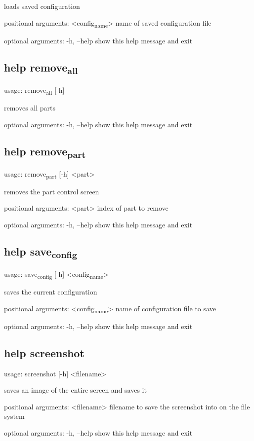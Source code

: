 \documentclass[11pt]{article}
\begin{document}
loads saved configuration

positional arguments:
  <config\textsubscript{name}>  name of saved configuration file

optional arguments:
  -h, --help     show this help message and exit

\subsection{help remove\textsubscript{all}}
\label{sec:orgad7ff3c}
usage: remove\textsubscript{all} [-h]

removes all parts

optional arguments:
  -h, --help  show this help message and exit

\subsection{help remove\textsubscript{part}}
\label{sec:orgc1d7e94}
usage: remove\textsubscript{part} [-h] <part>

removes the part control screen

positional arguments:
  <part>      index of part to remove

optional arguments:
  -h, --help  show this help message and exit

\subsection{help save\textsubscript{config}}
\label{sec:org42210c5}
usage: save\textsubscript{config} [-h] <config\textsubscript{name}>

saves the current configuration

positional arguments:
  <config\textsubscript{name}>  name of configuration file to save

optional arguments:
  -h, --help     show this help message and exit

\subsection{help screenshot}
\label{sec:org50e3f26}
usage: screenshot [-h] <filename>

saves an image of the entire screen and saves it

positional arguments:
  <filename>  filename to save the screenshot into on the file system

optional arguments:
  -h, --help  show this help message and exit
\end{document}

